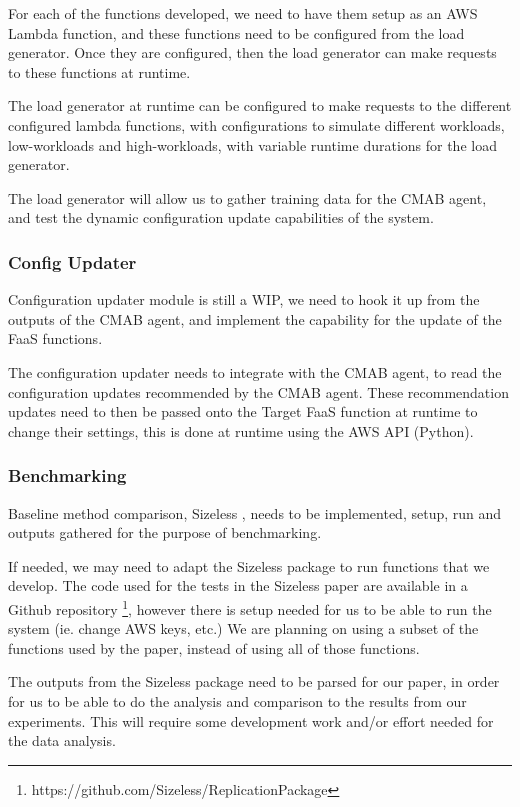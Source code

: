 \documentclass[conference]{IEEEtran}
\begin{document}
For each of the functions developed, we need to have them setup as an AWS Lambda function, and these functions need to be configured from the load generator. Once they are configured, then the load generator can make requests to these functions at runtime.

The load generator at runtime can be configured to make requests to the different configured lambda functions, with configurations to simulate different workloads, low-workloads and high-workloads, with variable runtime durations for the load generator.

The load generator will allow us to gather training data for the CMAB agent, and test the dynamic configuration update capabilities of the system.

\subsubsection{Config Updater}

Configuration updater module is still a WIP, we need to hook it up from the outputs of the CMAB agent, and implement the capability for the update of the FaaS functions.

The configuration updater needs to integrate with the CMAB agent, to read the configuration updates recommended by the CMAB agent. These recommendation updates need to then be passed onto the Target FaaS function at runtime to change their settings, this is done at runtime using the AWS API (Python).

\subsubsection{Benchmarking}

Baseline method comparison, Sizeless \cite{10.1145/3464298.3493398}, needs to be implemented, setup, run and outputs gathered for the purpose of benchmarking.

If needed, we may need to adapt the Sizeless package to run functions that we develop. The code used for the tests in the Sizeless paper \cite{10.1145/3464298.3493398} are available in a Github repository \footnote{https://github.com/Sizeless/ReplicationPackage}, however there is setup needed for us to be able to run the system (ie. change AWS keys, etc.) We are planning on using a subset of the functions used by the paper, instead of using all of those functions.

The outputs from the Sizeless package need to be parsed for our paper, in order for us to be able to do the analysis and comparison to the results from our experiments. This will require some development work and/or effort needed for the data analysis.
\end{document}
